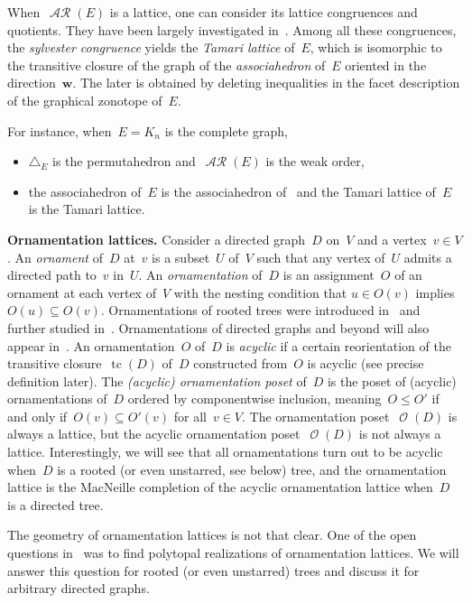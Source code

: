 \documentclass{amsart}
\theoremstyle{definition}
\renewcommand{\b}[1]{\boldsymbol{#1}} %
\renewcommand{\c}[1]{\mathcal{#1}} %
\newcommand{\simplex}{\triangle} %
\DeclareMathOperator{\tc}{tc} %
\newcommand{\para}[1]{\bigskip\noindent\textbf{#1}} %
\newcommand{\darkblue}{\color{darkblue}} %
\newcommand{\defn}[1]{\textsl{\darkblue #1}} %
\DeclareMathOperator{\Orn}{\c{O}}  %
\DeclareMathOperator{\AReori}{\c{AR}}  %
\begin{document}
When~$\AReori(E)$ is a lattice, one can consider its lattice congruences and quotients.
They have been largely investigated in~\cite{Pilaud-acyclicReorientationLattices}.
Among all these congruences, the \defn{sylvester congruence} yields the \defn{Tamari lattice} of~$E$, which is isomorphic to the transitive closure of the graph of the \defn{associahedron} of~$E$ oriented in the direction~$\b{w}$.
The later is obtained by deleting inequalities in the facet description of the graphical zonotope of~$E$.

For instance, when~$E = K_n$ is the complete graph,
\begin{itemize}
\item $\simplex_E$ is the permutahedron and~$\AReori(E)$ is the weak order,
\item the associahedron of~$E$ is the associahedron of~\cite{ShniderSternberg,Loday} and the Tamari lattice of~$E$ is the Tamari lattice.
\end{itemize}


\para{Ornamentation lattices.}
Consider a directed graph~$D$ on~$V$ and a vertex~$v \in V$.
An \defn{ornament} of~$D$ at~$v$ is a subset~$U$ of~$V$ such that any vertex of~$U$ admits a directed path to~$v$ in~$U$.
An \defn{ornamentation} of~$D$ is an assignment~$O$ of an ornament at each vertex of~$V$ with the nesting condition that $u \in O(v)$ implies~$O(u) \subseteq O(v)$.
Ornamentations of rooted trees were introduced in~\cite{DefantSack} and further studied in~\cite{ajran2025pop}.
Ornamentations of directed graphs and beyond will also appear in~\cite{Sack}.
An ornamentation~$O$ of~$D$ is \defn{acyclic} if a certain reorientation of the transitive closure~$\tc(D)$ of~$D$ constructed from~$O$ is acyclic (see precise definition later).
The \defn{(acyclic) ornamentation poset} of~$D$ is the poset of (acyclic) ornamentations of~$D$ ordered by componentwise inclusion, meaning~$O \le O'$ if and only if~${O(v) \subseteq O'(v)}$ for all~$v \in V$.
The ornamentation poset~$\Orn(D)$ is always a lattice, but the acyclic ornamentation poset~$\Orn(D)$ is not always a lattice.
Interestingly, we will see that all ornamentations turn out to be acyclic when~$D$ is a rooted (or even unstarred, see below) tree, and the ornamentation lattice is the MacNeille completion of the acyclic ornamentation lattice when~$D$ is a directed tree.

The geometry of ornamentation lattices is not that clear.
One of the open questions in~\cite{DefantSack} was to find polytopal realizations of ornamentation lattices.
We will answer this question for rooted (or even unstarred) trees and discuss it for arbitrary directed graphs.
\end{document}
